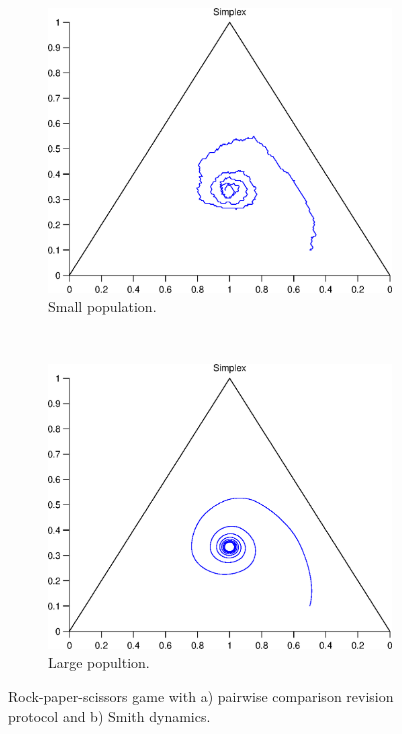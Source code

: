\begin{figure}[tbh]
  \centering
  \begin{subfigure}[b]{0.4\textwidth}
	  \includegraphics[width=\textwidth]{./images/test_finite_pairwise_comparison.eps}
	  \caption{Small population.}
	  \label{fig:finite3_protocol}
  \end{subfigure}
  ~ 
  \begin{subfigure}[b]{0.4\textwidth}
	  \includegraphics[width=\textwidth]{./images/test1_simplex_smith.eps}
	  \caption{Large popultion.}
	  \label{fig:finite3_dynamics}
  \end{subfigure}
  \caption{Rock-paper-scissors game with a) pairwise comparison revision protocol and b) Smith dynamics.}
  \label{fig:finite3}
\end{figure}


